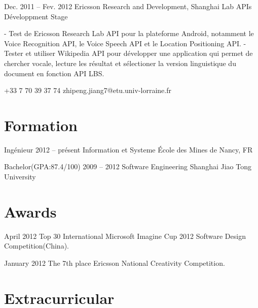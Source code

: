 \documentclass{tccv}
\begin{document}
\begin{eventlist}
\item{Dec. 2011 -- Fev. 2012}
     {Ericsson Research and Development, Shanghai}
     {Lab APIs Développment Stage}

- Test de Ericsson Research Lab API pour la plateforme Android, notamment le Voice Recognition API, le Voice Speech API et le Location Positioning API.
\newline
- Tester et utiliser Wikipedia API pour développer une application qui permet de chercher vocale, lecture les résultat et sélectioner la version linguistique du document en fonction API LBS.

\end{eventlist}

    {+33 7 70 39 37 74}
    {zhipeng.jiang7@etu.univ-lorraine.fr}

\section{Formation}

\begin{yearlist}

\item[Ingénieur]{2012 -- présent}
     {Information et Systeme}
     {École des Mines de Nancy, FR}

\item[Bachelor(GPA:87.4/100)]{2009 -- 2012}
     {Software Engineering}
     {Shanghai Jiao Tong University}

\end{yearlist}

\section{Awards}

\begin{yearlist}

\item{April 2012}
     {Top 30}
     {International Microsoft Imagine Cup 2012 Software Design Competition(China).}
     
\item{January 2012}
     {The 7th place}
     {Ericsson National Creativity Competition.}

\end{yearlist}

\section{Extracurricular}
\end{document}
